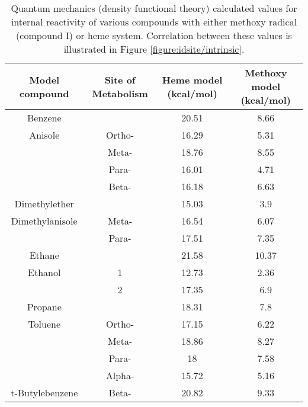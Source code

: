 \begin{table}[h]
\centering
\begin{tabular}{cccc}
\hline
Model compound & Site of Metabolism & Heme model (kcal/mol) & Methoxy model (kcal/mol) \\
\hline
Benzene &  & 20.51 & 8.66 \\
Anisole & Ortho- & 16.29 & 5.31 \\
 & Meta- & 18.76 & 8.55 \\
 & Para- & 16.01 & 4.71 \\
 & Beta- & 16.18 & 6.63 \\
Dimethylether &  & 15.03 & 3.9 \\
Dimethylanisole & Meta- & 16.54 & 6.07 \\
 & Para- & 17.51 & 7.35 \\
Ethane &  & 21.58 & 10.37 \\
Ethanol & 1 & 12.73 & 2.36 \\
 & 2 & 17.35 & 6.9 \\
Propane &  & 18.31 & 7.8 \\
Toluene & Ortho- & 17.15 & 6.22 \\
 & Meta- & 18.86 & 8.27 \\
 & Para- & 18 & 7.58 \\
 & Alpha- & 15.72 & 5.16 \\
t-Butylebenzene & Beta- & 20.82 & 9.33 \\
\hline
\end{tabular}
\caption{Quantum mechanics (density functional theory) calculated values for internal reactivity of various compounds with either methoxy radical (compound I) or heme system.
Correlation between these values is illustrated in Figure \ref{figure:idsite/intrinsic}.}
\label{table:heme_methoxy}
\end{table}
